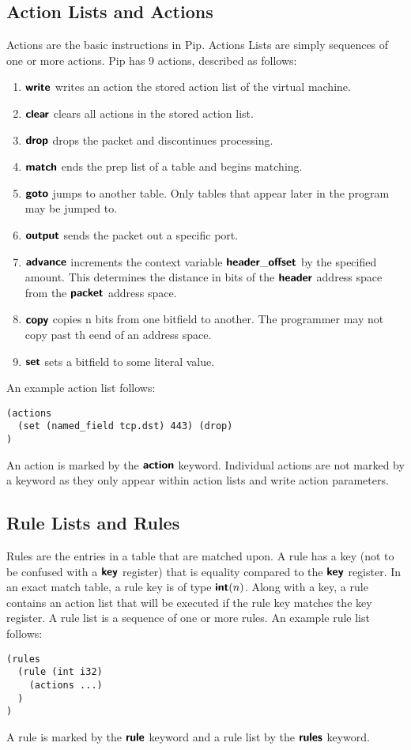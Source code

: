 \subsection{Action Lists and Actions}
Actions are the basic instructions in Pip. Actions Lists are simply sequences of one or more actions. Pip has 9 actions, described as follows: 
\begin{enumerate}
  \item $\bm{\mathsf{{write}}}$ writes an action the stored action list of the virtual machine. 
  \item $\bm{\mathsf{{clear}}}$ clears all actions in the stored action list.
  \item $\bm{\mathsf{{drop}}}$ drops the packet and discontinues processing.
  \item $\bm{\mathsf{{match}}}$ ends the prep list of a table and begins matching.
  \item $\bm{\mathsf{{goto}}}$ jumps to another table. Only tables that appear later in the program may be jumped to.
  \item $\bm{\mathsf{{output}}}$ sends the packet out a specific port.
  \item $\bm{\mathsf{{advance}}}$ increments the context variable $\bm{\mathsf{{header\_offset}}}$ by the specified amount. This determines the distance in bits of the $\bm{\mathsf{{header}}}$ address space from the $\bm{\mathsf{{packet}}}$ address space.
  \item $\bm{\mathsf{{copy}}}$ copies n bits from one bitfield to another. The programmer may not copy past th eend of an address space.
  \item $\bm{\mathsf{{set}}}$ sets a bitfield to some literal value.
\end{enumerate}
An example action list follows:
\begin{verbatim}
(actions
  (set (named_field tcp.dst) 443) (drop)
)
\end{verbatim}
An action is marked by the $\bm{\mathsf{{action}}}$ keyword. Individual actions are not marked by a keyword as they only appear within action lists and write action parameters.

\subsection{Rule Lists and Rules}
Rules are the entries in a table that are matched upon. A rule has a key (not to be confused with a $\bm{\mathsf{{key}}}$ register) that is equality compared to the $\bm{\mathsf{{key}}}$ register. In an exact match table, a rule key is of type $\bm{\mathsf{{int}}}(n)$. Along with a key, a rule contains an action list that will be executed if the rule key matches the key register. A rule list is a sequence of one or more rules. An example rule list follows:
\begin{verbatim}
(rules
  (rule (int i32)
    (actions ...)
  )
)
\end{verbatim}
A rule is marked by the $\bm{\mathsf{{rule}}}$ keyword and a rule list by the $\bm{\mathsf{{rules}}}$ keyword.

